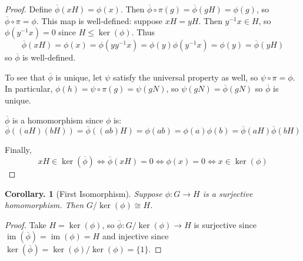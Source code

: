\documentclass[11pt, a4paper]{memoir}
\theoremstyle{change}
\newtheorem{corollary}[theorem]{Corollary.}
\theoremstyle{plain}
\theoremstyle{nonumberplain}
\newtheorem{proof}{Proof}
\DeclareMathOperator{\im}{im}
\numberwithin{equation}{section}
\begin{document}
\begin{proof}
    Define $\overline{\phi}(xH)=\phi(x)$.
    Then $\overline{\phi}\circ\pi(g)=\overline{\phi}(gH)=\phi(g)$, so $\overline{\phi}\circ\pi=\phi$.
    This map is well-defined: suppose $xH=yH$.
    Then $y^{-1}x\in H$, so $\phi(y^{-1}x)=0$ since $H\leq\ker(\phi)$.
    Thus
    \begin{equation*}
        \overline{\phi}(xH)=\phi(x)=\phi(yy^{-1}x)=\phi(y)\phi(y^{-1}x)=\phi(y)=\overline{\phi}(yH)
    \end{equation*}
    so $\overline{\phi}$ is well-defined.

    To see that $\overline{\phi}$ is unique, let $\psi$ satisfy the universal property as well, so $\psi\circ\pi=\phi$.
    In particular, $\phi(h)=\psi\circ\pi(g)=\psi(gN)$, so $\psi(gN)=\overline{\phi}(gN)$ so $\overline{\phi}$ is unique.

    $\overline{\phi}$ is a homomorphism since $\phi$ is:
    \begin{equation*}
        \overline{\phi}((aH)(bH))=\overline{\phi}((ab)H)=\phi(ab)=\phi(a)\phi(b)=\overline{\phi}(aH)\overline{\phi}(bH)
    \end{equation*}

    Finally,
    \begin{equation*}
        xH\in\ker(\overline{\phi})\iff\overline{\phi}(xH)=0\iff\phi(x)=0\iff x\in\ker(\phi)
    \end{equation*}
\end{proof}
\begin{corollary}[First Isomorphism]
    Suppose $\phi:G\to H$ is a surjective homomorphism.
    Then $G/\ker(\phi)\cong H$.
\end{corollary}
\begin{proof}
    Take $H=\ker(\phi)$, so $\overline{\phi}:G/\ker(\phi)\to H$ is surjective since $\im(\overline{\phi})=\im(\phi)=H$ and injective since $\ker(\overline{\phi})=\ker(\phi)/\ker(\phi)=\{1\}$.
\end{proof}
\end{document}
